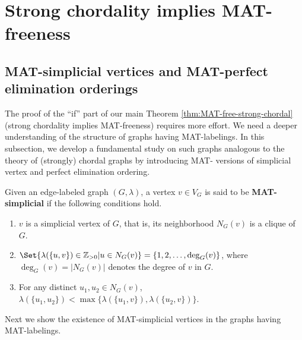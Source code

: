 \section{Strong chordality implies MAT-freeness}
\subsection{MAT-simplicial vertices and MAT-perfect elimination orderings}
\label{subsec:MAT-S-PEO}
 
The proof of the ``if'' part of our main Theorem \ref{thm:MAT-free-strong-chordal} (strong chordality implies MAT-freeness) requires more effort. 
We need a deeper understanding of the structure of graphs having MAT-labelings. 
In this subsection, we develop a fundamental study on such graphs analogous to the theory of (strongly) chordal graphs by introducing MAT- versions of simplicial vertex and perfect elimination ordering.
\begin{definition}
\label{definition MAT-simplicial}
Given an edge-labeled graph $ (G,\lambda) $, a vertex $ v \in V_{G} $ is said to be \textbf{MAT-simplicial} if the following conditions hold. 
\begin{enumerate}[(MS1)]
\item\label{definition MAT-simplicial 1} $ v $ is a simplicial vertex of $ G $, that is, its neighborhood $ N_{G}(v) $ is a clique of $ G $.
\item\label{definition MAT-simplicial 2} $ \Set{\lambda(\{u,v\}) \in \mathbb{Z}_{>0} | u \in N_{G}(v) } = \{1,2, \dots, \deg_{G}(v)\} $, where $ \deg_{G}(v) =|N_{G}(v) |$ denotes the degree  of $ v $ in $ G $. 
\item\label{definition MAT-simplicial 3} For any distinct  $ u_{1}, u_{2} \in N_{G}(v) $, $ \lambda(\{u_{1}, u_{2}\}) < \max\{\lambda(\{u_{1}, v\}), \lambda(\{u_{2}, v\})\} $. 
\end{enumerate}
\end{definition}


Next we show the existence of MAT-simplicial vertices in the graphs having MAT-labelings.


